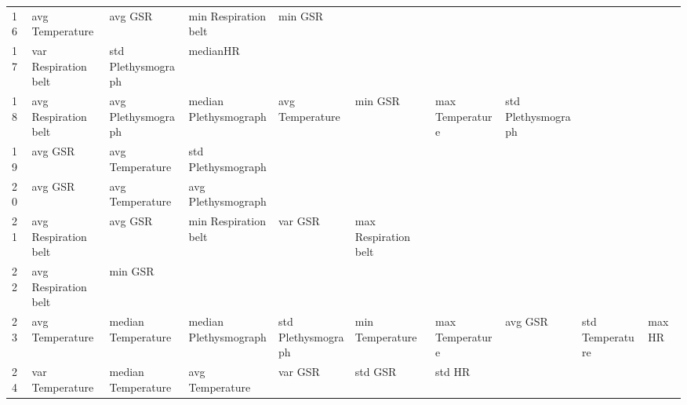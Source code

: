 \begin{landscape}
\begin{table}[]
\begin{tabular}{l|llllllll}
16       & avg Temperature         & avg GSR                 & min Respiration belt    & min GSR                 &                         &                       &                         &                         &                         &         \\
17       & var Respiration belt    & std Plethysmograph      & medianHR                &                         &                         &                       &                         &                         &                         &         \\
18       & avg Respiration belt    & avg Plethysmograph      & median Plethysmograph   & avg Temperature         & min GSR                 & max Temperature       & std Plethysmograph      &                         &                         &         \\
19       & avg GSR                 & avg Temperature         & std Plethysmograph      &                         &                         &                       &                         &                         &                         &         \\
20       & avg GSR                 & avg Temperature         & avg Plethysmograph      &                         &                         &                       &                         &                         &                         &         \\
21       & avg Respiration belt    & avg GSR                 & min Respiration belt    & var GSR                 & max Respiration belt    &                       &                         &                         &                         &         \\
22       & avg Respiration belt    & min GSR                 &                         &                         &                         &                       &                         &                         &                         &         \\
23       & avg Temperature         & median Temperature      & median Plethysmograph   & std Plethysmograph      & min Temperature         & max Temperature       & avg GSR                 & std Temperature         & maxHR                   &         \\
24       & var Temperature         & median Temperature      & avg Temperature         & var GSR                 & std GSR                 & std HR                &                         &                         &                         &         \\

\end{tabular}
\end{table}
\end{landscape}
